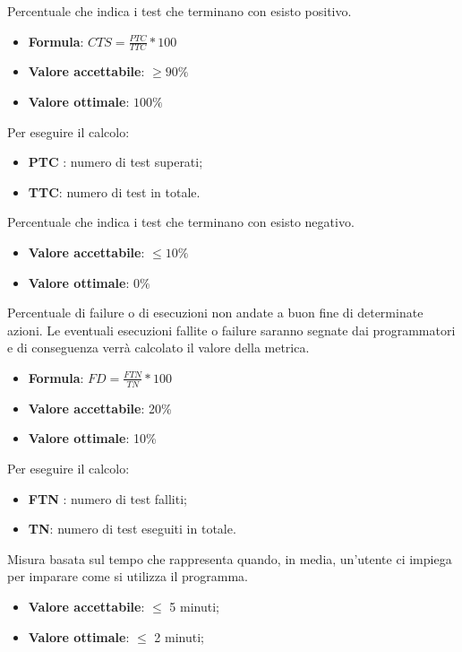 Percentuale che indica i test che terminano con esisto positivo.
\begin{itemize}
    \item \textbf{Formula}: $CTS=\frac{PTC}{TTC}*100$
    \item \textbf{Valore accettabile}: $\geq90\%$
    \item \textbf{Valore ottimale}: $100\%$
\end{itemize}
Per eseguire il calcolo:
\begin{itemize}
    \item \textbf{PTC} : numero di test superati;
    \item \textbf{TTC}: numero di test in totale.
\end{itemize} 


Percentuale che indica i test che terminano con esisto negativo.
\begin{itemize}
    \item \textbf{Valore accettabile}: $\leq10\%$
    \item \textbf{Valore ottimale}: $0\%$
\end{itemize}


Percentuale di failure o di esecuzioni non andate a buon fine di determinate azioni. Le
eventuali esecuzioni fallite o failure saranno segnate dai programmatori e di conseguenza verrà calcolato
il valore della metrica.
\begin{itemize}
    \item \textbf{Formula}: $FD=\frac{FTN}{TN}*100$
    \item \textbf{Valore accettabile}: 20\%
    \item \textbf{Valore ottimale}: 10\%
\end{itemize}  
Per eseguire il calcolo:
\begin{itemize}
    \item \textbf{FTN} : numero di test falliti;
    \item \textbf{TN}: numero di test eseguiti in totale.
\end{itemize}

Misura basata sul tempo che rappresenta quando, in media, un'utente ci impiega per imparare come si utilizza il programma.
\begin{itemize}
    \item \textbf{Valore accettabile}: $\leq$ 5 minuti;
    \item \textbf{Valore ottimale}: $\leq$ 2 minuti;
\end{itemize}  

